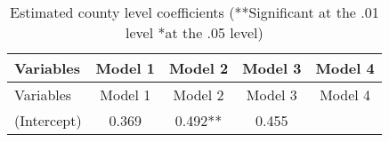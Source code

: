 \documentclass[]{article}
\begin{document}
\begin{longtable}[]{@{}lcccc@{}}
\caption{Estimated county level coefficients (**Significant at the .01
level *at the .05 level) \label{tab:county_coef}}\tabularnewline
\toprule
\begin{minipage}[b]{0.26\columnwidth}\raggedright\strut
Variables\strut
\end{minipage} & \begin{minipage}[b]{0.12\columnwidth}\centering\strut
Model 1\strut
\end{minipage} & \begin{minipage}[b]{0.13\columnwidth}\centering\strut
Model 2\strut
\end{minipage} & \begin{minipage}[b]{0.14\columnwidth}\centering\strut
Model 3\strut
\end{minipage} & \begin{minipage}[b]{0.14\columnwidth}\centering\strut
Model 4\strut
\end{minipage}\tabularnewline
\midrule
\endfirsthead
\toprule
\begin{minipage}[b]{0.26\columnwidth}\raggedright\strut
Variables\strut
\end{minipage} & \begin{minipage}[b]{0.12\columnwidth}\centering\strut
Model 1\strut
\end{minipage} & \begin{minipage}[b]{0.13\columnwidth}\centering\strut
Model 2\strut
\end{minipage} & \begin{minipage}[b]{0.14\columnwidth}\centering\strut
Model 3\strut
\end{minipage} & \begin{minipage}[b]{0.14\columnwidth}\centering\strut
Model 4\strut
\end{minipage}\tabularnewline
\midrule
\endhead
\begin{minipage}[t]{0.26\columnwidth}\raggedright\strut
(Intercept)\strut
\end{minipage} & \begin{minipage}[t]{0.12\columnwidth}\centering\strut
0.369\strut
\end{minipage} & \begin{minipage}[t]{0.13\columnwidth}\centering\strut
0.492**\strut
\end{minipage} & \begin{minipage}[t]{0.14\columnwidth}\centering\strut
0.455\strut
\end{minipage} & \begin{minipage}[t]{0.14\columnwidth}\centering\strut

\end{minipage}
\end{longtable}
\end{document}
